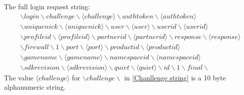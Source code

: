 \documentclass[oneside,titlepage,a4paper]{report} %
\begin{document}
The full login request string:
\begin{equation}\label{Chanllenge string}
\begin{split}
	&\backslash login \backslash challenge \backslash \langle challenge \rangle \backslash authtoken \backslash \langle authtoken \rangle \\& \backslash uniquenick \backslash \langle uniquenick \rangle \backslash user \backslash \langle user \rangle 
	\backslash userid \backslash \langle userid \rangle \\& \backslash profileid \backslash \langle profileid \rangle \backslash partnerid \backslash \langle partnerid \rangle \backslash response \backslash \langle response \rangle \\&
	 \backslash firewall \backslash 1 \backslash port \backslash \langle port \rangle \backslash productid \backslash  \langle productid \rangle \\& \backslash gamename \backslash \langle gamename \rangle \backslash namespaceid \backslash \langle namespaceid \rangle \\& \backslash  sdkrevision \backslash \langle sdkrevision \rangle \backslash quiet \backslash \langle quiet \rangle \backslash id \backslash 1 \backslash final \backslash
\end{split}
\end{equation}
The value $ \langle challenge \rangle $ for $ \backslash challenge \backslash $ in \ref{Chanllenge string} is a 10 byte alphanumeric string.
\end{document}
